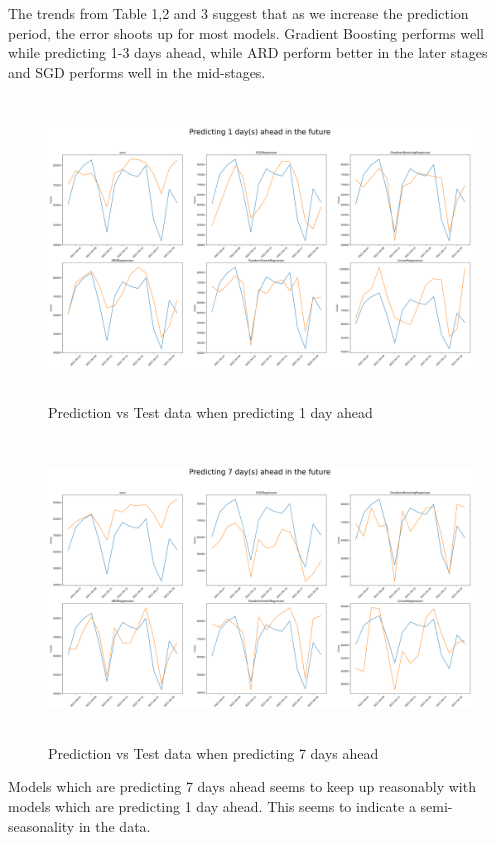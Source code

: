 \documentclass[12pt,a4paper]{article}
\begin{document}
The trends from Table 1,2 and 3 suggest that as we increase the prediction period, 
the error shoots up for most models. Gradient Boosting performs well while predicting 1-3 days ahead, while ARD perform better in the later stages and
SGD performs well in the mid-stages. 
\newpage
\begin{figure}[H]
    \centering
    \includegraphics[width=1\textwidth,height=80mm]{images/usa/1_day.png}
    \caption{Prediction vs Test data when predicting 1 day ahead}
\end{figure}

\begin{figure}[H]
    \centering
    \includegraphics[width=1\textwidth,height=80mm]{images/usa/7_day.png}
    \caption{Prediction vs Test data when predicting 7 days ahead}
\end{figure}
Models which are predicting 7 days ahead seems to keep up reasonably with models which are
predicting 1 day ahead. This seems to indicate a semi-seasonality in the data.  
\end{document}
